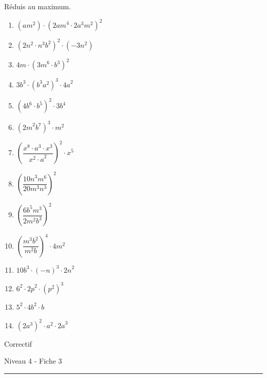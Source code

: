 \documentclass[12pt,parskip=half-, twoside=semi]{scrartcl}
\begin{document}
\begin{exercise}
  Réduis au maximum. 
  \begin{enumerate}[cols=3]
    \item \({\left( am^{2} \right) \cdot \left( {2am}^{4} \cdot 2a^{3}m^{2} \right)}^{2}\)
    \item \(\left( 2n^{2} \cdot n^{3}b^{2} \right)^{2} \cdot ( - 3n^{2})\)
    \item \({4m \cdot \left( {3m}^{6} \cdot b^{3} \right)}^{2}\)
    \item \({3b^{3} \cdot \left( b^{3}a^{2} \right)}^{3} \cdot {4a}^{2}\)
    \item \(\left( 4b^{6} \cdot b^{5} \right)^{2} \cdot 3b^{4}\)
    \item \(\left( {2m}^{2}b^{7} \right)^{3} \cdot m^{2}\)
    \item \(\left( \dfrac{x^{8} \cdot a^{3} \cdot x^{3}}{{x^{2} \cdot a}^{2}} \right)^{2} \cdot x^{5}\)
    \item \(\left( \dfrac{{10n}^{3}m^{6}}{20m^{3}n^{3}} \right)^{2}\)
    \item \(\left( \dfrac{{6b}^{5}m^{3}}{2m^{2}b^{3}} \right)^{2}\)
    \item \(\left( \dfrac{m^{3}b^{2}}{m^{2}b} \right)^{4} \cdot 4m^{2}\)
    \item \({10b}^{3} \cdot ( - n)^{3} \cdot {2n}^{2}\)
    \item \(6^{2} \cdot {2p}^{2} \cdot \left( p^{2} \right)^{3} \)
    \item \(5^{2} \cdot {4b}^{2} \cdot b\)
    \item \(\left( 2a^{3} \right)^{2} \cdot a^{2} \cdot {2a}^{3}\)
    
  \end{enumerate}
\end{exercise}


\newpage
\begin{center}
  \bfseries
  \begin{Huge}
    Correctif
  \end{Huge}
  \smallbreak
  \begin{large}
    Niveau 4  - Fiche 3
  \end{large}
  \smallbreak
  \rule[10pt]{.5\linewidth}{1 pt}
\end{center}

\setcounter{exercise}{0}
\end{document}
